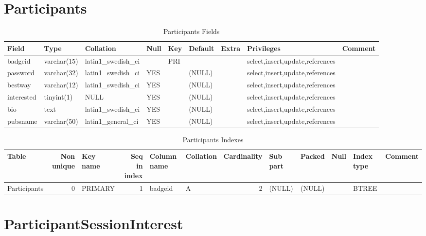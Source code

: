 \documentclass[captions=tablesignature]{scrartcl}
\begin{document}
\section{Participants}
\label{sec-10}

\begin{table}[htb]
\caption{\label{tbl:participantsfields}Participants Fields}
\centering
\begin{tabular}{lllllllll}
\hline
Field & Type & Collation & Null & Key & Default & Extra & Privileges & Comment\\
\hline
badgeid & varchar(15) & latin1\_swedish\_ci &  & PRI &  &  & select,insert,update,references & \\
password & varchar(32) & latin1\_swedish\_ci & YES &  & (NULL) &  & select,insert,update,references & \\
bestway & varchar(12) & latin1\_swedish\_ci & YES &  & (NULL) &  & select,insert,update,references & \\
interested & tinyint(1) & NULL & YES &  & (NULL) &  & select,insert,update,references & \\
bio & text & latin1\_swedish\_ci & YES &  & (NULL) &  & select,insert,update,references & \\
pubsname & varchar(50) & latin1\_general\_ci & YES &  & (NULL) &  & select,insert,update,references & \\
\hline
\end{tabular}
\end{table}

\begin{table}[htb]
\caption{\label{tbl:participantsindexes}Participants Indexes}
\centering
\begin{tabular}{lrlrllrlllll}
\hline
Table & Non unique & Key name & Seq in index & Column name & Collation & Cardinality & Sub part & Packed & Null & Index type & Comment\\
\hline
Participants & 0 & PRIMARY & 1 & badgeid & A & 2 & (NULL) & (NULL) &  & BTREE & \\
\hline
\end{tabular}
\end{table}
\section{ParticipantSessionInterest}
\label{sec-11}
\end{document}
